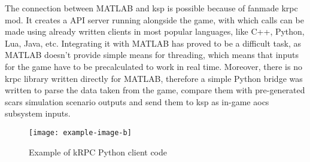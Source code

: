         The connection between MATLAB and \ac{ksp} is possible because of fanmade \ac{krpc} mod. It creates a API server running alongside the game, with which calls can be made using already written clients in most popular languages, like C++, Python, Lua, Java, etc. Integrating it with MATLAB has proved to be a difficult task, as MATLAB doesn't provide simple means for threading, which means that inputs for the game have to be precalculated to work in real time. Moreover, there is no \ac{krpc} library written directly for MATLAB, therefore a simple Python bridge was written to parse the data taken from the game, compare them with pre-generated \ac{scars} simulation scenario outputs and send them to \ac{ksp} as in-game \ac{aocs} subsystem inputs.

        \begin{figure}[H]
            \centering
            \texttt{[image: example-image-b]}
            \caption{Example of kRPC Python client code}
            \label{fig:krcp}
        \end{figure}